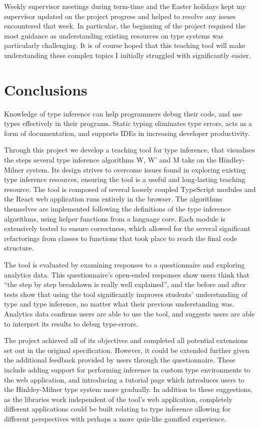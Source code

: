 \documentclass[a4paper,fleqn,twoside,12pt]{report}
\begin{document}
Weekly supervisor meetings during term-time and the Easter holidays kept my supervisor updated on the project progress and helped to resolve any issues encountered that week. In particular, the beginning of the project required the most guidance as understanding existing resources on type systems was particularly challenging. It is of course hoped that this teaching tool will make understanding these complex topics I initially struggled with significantly easier.
\chapter{Conclusions}\label{id:h.90axtam6qk9n}
Knowledge of type inference can help programmers debug their code, and use types effectively in their programs. Static typing eliminates type errors, acts as a form of documentation, and supports IDEs in increasing developer productivity.

Through this project we develop a teaching tool for type inference, that visualises the steps several type inference algorithms W, W’ and M take on the Hindley-Milner system. Its design strives to overcome issues found in exploring existing type inference resources, ensuring the tool is a useful and long-lasting teaching resource. The tool is composed of several loosely coupled TypeScript modules and the React web application runs entirely in the browser. The algorithms themselves are implemented following the definitions of the type inference algorithms, using helper functions from a language core. Each module is extensively tested to ensure correctness, which allowed for the several significant refactorings from classes to functions that took place to reach the final code structure.

The tool is evaluated by examining responses to a questionnaire and exploring analytics data. This questionnaire’s open-ended responses show users think that “the step by step breakdown is really well explained”, and the before and after tests show that using the tool significantly improves students' understanding of type and type inference, no matter what their previous understanding was. Analytics data confirms users are able to use the tool, and suggests users are able to interpret its results to debug type-errors.

The project achieved all of its objectives and completed all potential extensions set out in the original specification. However, it could be extended further given the additional feedback provided by users through the questionnaire. These include adding support for performing inference in custom type environments to the web application, and introducing a tutorial page which introduces users to the Hinldey-Milner type system more gradually. In addition to these suggestions, as the libraries work independent of the tool’s web application, completely different applications could be built relating to type inference allowing for different perspectives with perhaps a more quiz-like gamified experience.
\end{document}
